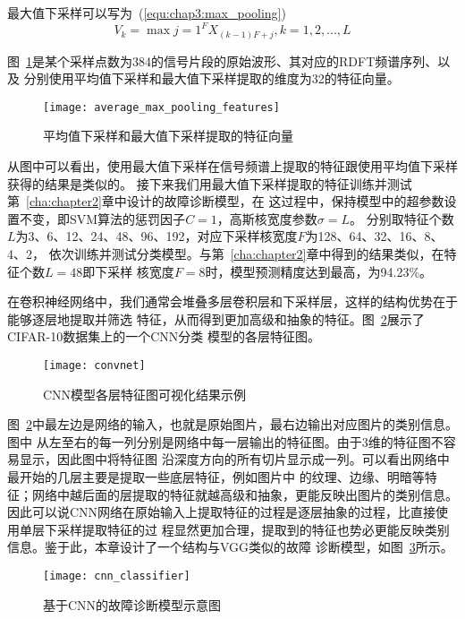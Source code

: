 最大值下采样可以写为~(\ref{equ:chap3:max_pooling})
\begin{equation}
  \label{equ:chap3:max_pooling}
  V_k = \max{j=1}^{F}X_{(k-1)F+j}, k=1,2,...,L
\end{equation}

图~\ref{fig:average_max_pooling_features}是某个采样点数为384的信号片段的原始波形、其对应的RDFT频谱序列、以及
分别使用平均值下采样和最大值下采样提取的维度为32的特征向量。
\begin{figure}[ht]
  \centering
  \texttt{[image: average\_max\_pooling\_features]}
  \caption{平均值下采样和最大值下采样提取的特征向量}
  \label{fig:average_max_pooling_features}
\end{figure}

从图中可以看出，使用最大值下采样在信号频谱上提取的特征跟使用平均值下采样获得的结果是类似的。
接下来我们用最大值下采样提取的特征训练并测试第~\ref{cha:chapter2}章中设计的故障诊断模型，在
这过程中，保持模型中的超参数设置不变，即SVM算法的惩罚因子$C=1$，高斯核宽度参数$\sigma=L$。
分别取特征个数$L$为3、6、12、24、48、96、192，对应下采样核宽度$F$为128、64、32、16、8、4、2，
依次训练并测试分类模型。与第~\ref{cha:chapter2}章中得到的结果类似，在特征个数$L=48$即下采样
核宽度$F=8$时，模型预测精度达到最高，为94.23\%。

在卷积神经网络中，我们通常会堆叠多层卷积层和下采样层，这样的结构优势在于能够逐层地提取并筛选
特征，从而得到更加高级和抽象的特征。图~\ref{fig:convnet}展示了CIFAR-10数据集上的一个CNN分类
模型的各层特征图。
\begin{figure}[ht]
  \centering%
  \texttt{[image: convnet]}
  \caption{CNN模型各层特征图可视化结果示例}
  \label{fig:convnet}
\end{figure}

图~\ref{fig:convnet}中最左边是网络的输入，也就是原始图片，最右边输出对应图片的类别信息。图中
从左至右的每一列分别是网络中每一层输出的特征图。由于3维的特征图不容易显示，因此图中将特征图
沿深度方向的所有切片显示成一列。可以看出网络中最开始的几层主要是提取一些底层特征，例如图片中
的纹理、边缘、明暗等特征；网络中越后面的层提取的特征就越高级和抽象，更能反映出图片的类别信息。
因此可以说CNN网络在原始输入上提取特征的过程是逐层抽象的过程，比直接使用单层下采样提取特征的过
程显然更加合理，提取到的特征也势必更能反映类别信息。鉴于此，本章设计了一个结构与VGG类似的故障
诊断模型，如图~\ref{fig:cnn_classifier}所示。
\begin{figure}[ht]
  \centering%
  \texttt{[image: cnn\_classifier]}
  \caption{基于CNN的故障诊断模型示意图}
  \label{fig:cnn_classifier}
\end{figure}


